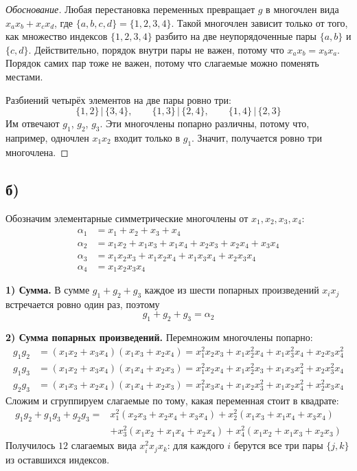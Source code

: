 \documentclass[12pt]{article}
\begin{document}
	\begin{proof}[Обоснование]
		Любая перестановка переменных превращает $g$ в многочлен вида $x_ax_b + x_cx_d$, где $\{a, b, c, d\} = \{1, 2, 3, 4\}$. Такой многочлен зависит только от того, как множество индексов $\{1, 2, 3, 4\}$ разбито на две неупорядоченные пары $\{a, b\}$ и $\{c, d\}$. Действительно, порядок внутри пары не важен, потому что $x_ax_b = x_bx_a$. Порядок самих пар тоже не важен, потому что слагаемые можно поменять местами.

		Разбиений четырёх элементов на две пары ровно три:
		\[
			\{1, 2\} \,|\, \{3, 4\}, \qquad \{1, 3\} \,|\, \{2, 4\}, \qquad \{1, 4\} \,|\, \{2, 3\}
		\]
		Им отвечают $g_1$, $g_2$, $g_3$. Эти многочлены попарно различны, потому что, например, одночлен $x_1x_2$ входит только в $g_1$. Значит, получается ровно три многочлена.
	\end{proof}

	\subsection*{б)}

	Обозначим элементарные симметрические многочлены от $x_1, x_2, x_3, x_4$:
	\begin{align*}
		\alpha_1 &= x_1 + x_2 + x_3 + x_4 \\
		\alpha_2 &= x_1x_2 + x_1x_3 + x_1x_4 + x_2x_3 + x_2x_4 + x_3x_4 \\
		\alpha_3 &= x_1x_2x_3 + x_1x_2x_4 + x_1x_3x_4 + x_2x_3x_4 \\
		\alpha_4 &= x_1x_2x_3x_4
	\end{align*}

	\medskip
	\noindent
	\textbf{1) Сумма.} В сумме $g_1 + g_2 + g_3$ каждое из шести попарных произведений $x_ix_j$ встречается ровно один раз, поэтому
	\[
		\boxed{g_1 + g_2 + g_3 = \alpha_2}
	\]

	\medskip
	\noindent
	\textbf{2) Сумма попарных произведений.} Перемножим многочлены попарно:
	\begin{align*}
		g_1g_2 &= (x_1x_2 + x_3x_4)(x_1x_3 + x_2x_4) = x_1^2x_2x_3 + x_1x_2^2x_4 + x_1x_3^2x_4 + x_2x_3x_4^2 \\
		g_1g_3 &= (x_1x_2 + x_3x_4)(x_1x_4 + x_2x_3) = x_1^2x_2x_4 + x_1x_2^2x_3 + x_1x_3x_4^2 + x_2x_3^2x_4 \\
		g_2g_3 &= (x_1x_3 + x_2x_4)(x_1x_4 + x_2x_3) = x_1^2x_3x_4 + x_1x_2x_3^2 + x_1x_2x_4^2 + x_2^2x_3x_4
	\end{align*}
	Сложим и сгруппируем слагаемые по тому, какая переменная стоит в квадрате:
	\begin{align*}
		g_1g_2 + g_1g_3 + g_2g_3 = {}& x_1^2(x_2x_3 + x_2x_4 + x_3x_4) + x_2^2(x_1x_3 + x_1x_4 + x_3x_4) \\
		&+ x_3^2(x_1x_2 + x_1x_4 + x_2x_4) + x_4^2(x_1x_2 + x_1x_3 + x_2x_3)
	\end{align*}
	Получилось $12$ слагаемых вида $x_i^2x_jx_k$: для каждого $i$ берутся все три пары $\{j, k\}$ из оставшихся индексов.
\end{document}

